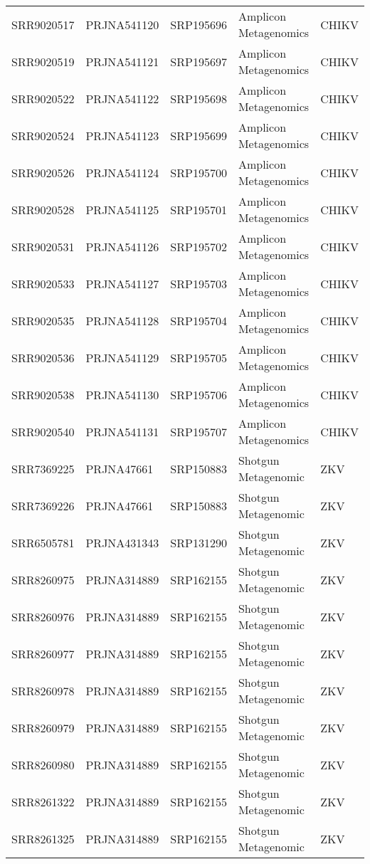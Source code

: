 \begin{scriptsize}
\begin{center}
\begin{longtable}{@{}lllll@{}}
SRR9020517 & PRJNA541120 & SRP195696 & Amplicon Metagenomics & CHIKV    \\
SRR9020519 & PRJNA541121 & SRP195697 & Amplicon Metagenomics & CHIKV    \\
SRR9020522 & PRJNA541122 & SRP195698 & Amplicon Metagenomics & CHIKV    \\
SRR9020524 & PRJNA541123 & SRP195699 & Amplicon Metagenomics & CHIKV    \\
SRR9020526 & PRJNA541124 & SRP195700 & Amplicon Metagenomics & CHIKV    \\
SRR9020528 & PRJNA541125 & SRP195701 & Amplicon Metagenomics & CHIKV    \\
SRR9020531 & PRJNA541126 & SRP195702 & Amplicon Metagenomics & CHIKV    \\
SRR9020533 & PRJNA541127 & SRP195703 & Amplicon Metagenomics & CHIKV    \\
SRR9020535 & PRJNA541128 & SRP195704 & Amplicon Metagenomics & CHIKV    \\
SRR9020536 & PRJNA541129 & SRP195705 & Amplicon Metagenomics & CHIKV    \\
SRR9020538 & PRJNA541130 & SRP195706 & Amplicon Metagenomics & CHIKV    \\
SRR9020540 & PRJNA541131 & SRP195707 & Amplicon Metagenomics & CHIKV    \\
SRR7369225 & PRJNA47661  & SRP150883 & Shotgun Metagenomic   & ZKV      \\
SRR7369226 & PRJNA47661  & SRP150883 & Shotgun Metagenomic   & ZKV      \\
SRR6505781 & PRJNA431343 & SRP131290 & Shotgun Metagenomic   & ZKV      \\
SRR8260975 & PRJNA314889 & SRP162155 & Shotgun Metagenomic   & ZKV      \\
SRR8260976 & PRJNA314889 & SRP162155 & Shotgun Metagenomic   & ZKV      \\
SRR8260977 & PRJNA314889 & SRP162155 & Shotgun Metagenomic   & ZKV      \\
SRR8260978 & PRJNA314889 & SRP162155 & Shotgun Metagenomic   & ZKV      \\
SRR8260979 & PRJNA314889 & SRP162155 & Shotgun Metagenomic   & ZKV      \\
SRR8260980 & PRJNA314889 & SRP162155 & Shotgun Metagenomic   & ZKV      \\
SRR8261322 & PRJNA314889 & SRP162155 & Shotgun Metagenomic   & ZKV      \\
SRR8261325 & PRJNA314889 & SRP162155 & Shotgun Metagenomic   & ZKV      \\

\end{longtable}
\end{center}
\end{scriptsize}
